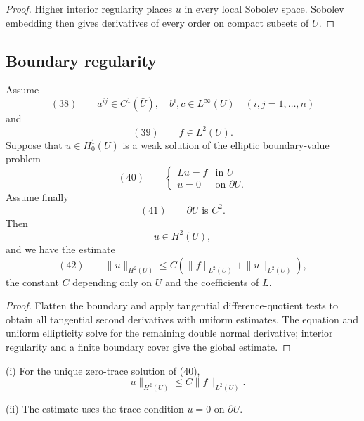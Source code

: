 \begin{proof}
\sketch Higher interior regularity places $u$ in every local Sobolev space. Sobolev embedding then gives derivatives of every order on compact subsets of $U$.
\end{proof}

\subsection{Boundary regularity}

\begin{theorem}
\label{thm:boundary-h2-regularity}
Assume
$$(38) \qquad a^{ij} \in C^1(\bar U), \quad b^i,c \in L^\infty(U) \quad (i,j=1,\ldots,n)$$
and
$$(39) \qquad f \in L^2(U).$$
Suppose that $u \in H_0^1(U)$ is a weak solution of the elliptic boundary-value problem
$$(40) \qquad \begin{cases} Lu = f & \text{in } U \\ u = 0 & \text{on } \partial U. \end{cases}$$
Assume finally
$$(41) \qquad \partial U \text{ is } C^2.$$
Then
$$u \in H^2(U),$$
and we have the estimate
$$(42) \qquad \|u\|_{H^2(U)} \leq C(\|f\|_{L^2(U)}+\|u\|_{L^2(U)}),$$
the constant $C$ depending only on $U$ and the coefficients of $L$.
\end{theorem}

\begin{proof}
\sketch Flatten the boundary and apply tangential difference-quotient tests to obtain all tangential second derivatives with uniform estimates. The equation and uniform ellipticity solve for the remaining double normal derivative; interior regularity and a finite boundary cover give the global estimate.
\end{proof}

\begin{remark}
\label{rem:boundary-regularity-remarks}
(i) For the unique zero-trace solution of (40),
$$\|u\|_{H^2(U)} \leq C\|f\|_{L^2(U)}.$$

(ii) The estimate uses the trace condition $u=0$ on $\partial U$.
\end{remark}

